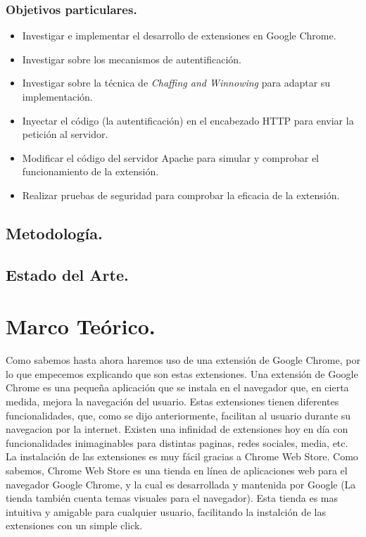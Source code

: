 \documentclass[12pt, a4paper, titlepage]{article}
\begin{document}
			\subsubsection{Objetivos particulares.\\}
			\begin{itemize}
				\item Investigar e implementar el desarrollo de extensiones en Google Chrome.
				\item Investigar sobre los mecanismos de autentificación.
				\item Investigar sobre la técnica de \textit{Chaffing and Winnowing} para adaptar su implementación.
				\item Inyectar el código (la autentificación) en el encabezado HTTP para enviar la petición al servidor. 
				\item Modificar el código del servidor Apache para simular y comprobar el funcionamiento de la extensión.
				\item Realizar pruebas de seguridad para comprobar la eficacia de la extensión. 
			\end{itemize}
		\subsection{Metodología.}
		\subsection{Estado del Arte.}
	\newpage
	\section{\textcolor{azulescom}{Marco Teórico.}}
		Como sabemos hasta ahora haremos uso de una extensión de Google Chrome, por lo que empecemos explicando que son estas extensiones. Una extensión de Google Chrome es una pequeña aplicación que se instala en el navegador que, en cierta medida, mejora la navegación del usuario. Estas extensiones tienen diferentes funcionalidades, que, como se dijo anteriormente, facilitan al usuario durante su navegacion por la internet. Existen una infinidad de extensiones hoy en día con funcionalidades inimaginables para distintas paginas, redes sociales, media, etc. La instalación de las extensiones es muy fácil gracias a Chrome Web Store. Como sabemos, Chrome Web Store es una tienda en línea de aplicaciones web para el navegador Google Chrome, y la cual es desarrollada y mantenida por Google (La tienda también cuenta temas visuales para el navegador). Esta tienda es mas intuitiva y amigable para cualquier usuario, facilitando la instalción de las extensiones con un simple click.
	\newpage
\end{document}
